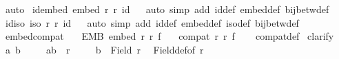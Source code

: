 \begin{isabellebody}
\ auto\isanewline
{}\isamarkupfalse%
%
\endisatagproof
{\isafoldproof}%
%
\isadelimproof
\isanewline
%
\endisadelimproof
\isanewline
{}\isamarkupfalse%
\ id{\isacharunderscore}{\kern0pt}embed{\isacharcolon}{\kern0pt}\ {\isachardoublequoteopen}embed\ r\ r\ id{\isachardoublequoteclose}\isanewline
%
\isadelimproof
\ \ %
\endisadelimproof
%
\isatagproof
{}\isamarkupfalse%
{\isacharparenleft}{\kern0pt}auto\ simp\ add{\isacharcolon}{\kern0pt}\ id{\isacharunderscore}{\kern0pt}def\ embed{\isacharunderscore}{\kern0pt}def\ bij{\isacharunderscore}{\kern0pt}betw{\isacharunderscore}{\kern0pt}def{\isacharparenright}{\kern0pt}%
\endisatagproof
{\isafoldproof}%
%
\isadelimproof
\isanewline
%
\endisadelimproof
\isanewline
{}\isamarkupfalse%
\ id{\isacharunderscore}{\kern0pt}iso{\isacharcolon}{\kern0pt}\ {\isachardoublequoteopen}iso\ r\ r\ id{\isachardoublequoteclose}\isanewline
%
\isadelimproof
\ \ %
\endisadelimproof
%
\isatagproof
{}\isamarkupfalse%
{\isacharparenleft}{\kern0pt}auto\ simp\ add{\isacharcolon}{\kern0pt}\ id{\isacharunderscore}{\kern0pt}def\ embed{\isacharunderscore}{\kern0pt}def\ iso{\isacharunderscore}{\kern0pt}def\ bij{\isacharunderscore}{\kern0pt}betw{\isacharunderscore}{\kern0pt}def{\isacharparenright}{\kern0pt}%
\endisatagproof
{\isafoldproof}%
%
\isadelimproof
\isanewline
%
\endisadelimproof
\isanewline
{}\isamarkupfalse%
\ embed{\isacharunderscore}{\kern0pt}compat{\isacharcolon}{\kern0pt}\isanewline
\ \ \ EMB{\isacharcolon}{\kern0pt}\ {\isachardoublequoteopen}embed\ r\ r{\isacharprime}{\kern0pt}\ f{\isachardoublequoteclose}\isanewline
\ \ \ {\isachardoublequoteopen}compat\ r\ r{\isacharprime}{\kern0pt}\ f{\isachardoublequoteclose}\isanewline
%
\isadelimproof
\ \ %
\endisadelimproof
%
\isatagproof
{}\isamarkupfalse%
\ compat{\isacharunderscore}{\kern0pt}def\isanewline
{}\isamarkupfalse%
\ clarify\isanewline
\ \ \isamarkupfalse%
\ a\ b\isanewline
\ \ \isamarkupfalse%
\ {\isacharasterisk}{\kern0pt}{\isacharcolon}{\kern0pt}\ {\isachardoublequoteopen}{\isacharparenleft}{\kern0pt}a{\isacharcomma}{\kern0pt}b{\isacharparenright}{\kern0pt}\ {\isasymin}\ r{\isachardoublequoteclose}\isanewline
\ \ \isamarkupfalse%
\ {}{\isacharcolon}{\kern0pt}\ {\isachardoublequoteopen}b\ {\isasymin}\ Field\ r{\isachardoublequoteclose}\ \isamarkupfalse%
\ Field{\isacharunderscore}{\kern0pt}def{\isacharbrackleft}{\kern0pt}of\ r{\isacharbrackright}{\kern0pt}\ \isamarkupfalse%

\end{isabellebody}
